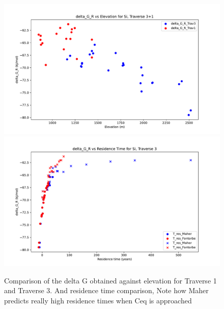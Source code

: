 \begin{figure}[h]
    \centering
    \includegraphics[width=\textwidth]{delta_G_R_Si_comparison_Trav1.pdf}
    \includegraphics[width=\textwidth]{delta_G_R_Si_time_trav1.pdf}
    \caption{Comparison of the delta G obtained against elevation for Traverse 1 and Traverse 3. And residence time comparison, Note how Maher predicts really high residence times when Ceq is approached}
    \label{fig:discussion9}
\end{figure}

\FloatBarrier







